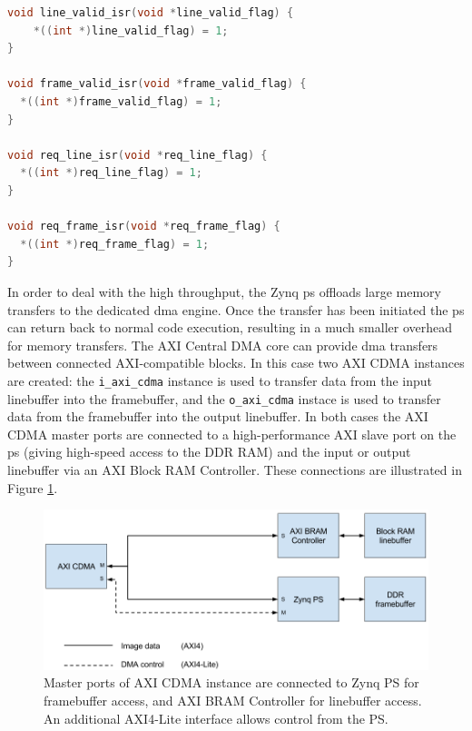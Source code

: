 \begin{lstlisting}[caption={\glspl{isr} for handling buffer controller interrupts.}, label={lst:isr_functions} language=C]
void line_valid_isr(void *line_valid_flag) {
    *((int *)line_valid_flag) = 1;
}

void frame_valid_isr(void *frame_valid_flag) {
  *((int *)frame_valid_flag) = 1;
}

void req_line_isr(void *req_line_flag) {
  *((int *)req_line_flag) = 1;
}

void req_frame_isr(void *req_frame_flag) {
  *((int *)req_frame_flag) = 1;
}
\end{lstlisting}

In order to deal with the high throughput, the Zynq \gls{ps} offloads large memory transfers to the dedicated \gls{dma} engine. Once the transfer has been initiated the \gls{ps} can return back to normal code execution, resulting in a much smaller overhead for memory transfers. The AXI Central DMA core can provide \gls{dma} transfers between connected AXI-compatible blocks. In this case two AXI CDMA instances are created: the \texttt{i\_axi\_cdma} instance is used to transfer data from the input linebuffer into the framebuffer, and the \texttt{o\_axi\_cdma} instace is used to transfer data from the framebuffer into the output linebuffer. In both cases the AXI CDMA master ports are connected to a high-performance AXI slave port on the \gls{ps} (giving high-speed access to the DDR RAM) and the input or output linebuffer via an AXI Block RAM Controller. These connections are illustrated in Figure \ref{fig:axi_cdma}.

\begin{figure}
  \centering
  \includegraphics[width=1\textwidth]{./img/axi_cdma.png}
  \caption{Master ports of AXI CDMA instance are connected to Zynq PS for framebuffer access, and AXI BRAM Controller for linebuffer access. An additional AXI4-Lite interface allows control from the PS.}
  \label{fig:axi_cdma}
\end{figure}


